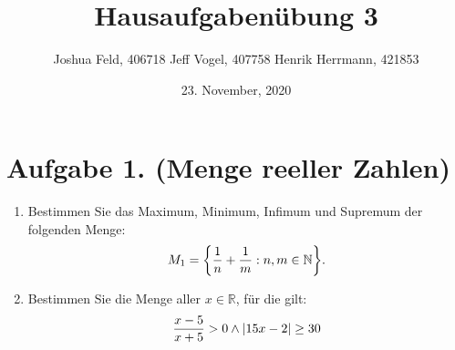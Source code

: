 \documentclass[german,12pt]{homework}
\title{Hausaufgabenübung 3}
\author{Joshua Feld, 406718 \quad Jeff Vogel, 407758 \quad Henrik Herrmann, 421853}
\date{23. November, 2020}
\institute{RWTH Aachen University\\Center for Computational Engineering Science}
\newcommand{\NN}{\mathbb{N}}
\newcommand{\RR}{\mathbb{R}}
\DeclarePairedDelimiter{\absolute}{\lvert}{\rvert}
\DeclarePairedDelimiter{\penbrace}{\{}{\}}
\begin{document}
    \maketitle

    \section*{Aufgabe 1. (Menge reeller Zahlen)}

    \begin{problem}
        \begin{enumerate}
            \item Bestimmen Sie das Maximum, Minimum, Infimum und Supremum der
            folgenden Menge:
            \[M_1 = \penbrace*{\frac{1}{n} + \frac{1}{m} : n, m \in \NN}.\]
            \item Bestimmen Sie die Menge aller \(x \in \RR\), für die gilt:
            \[\frac{x - 5}{x + 5} > 0 \land \absolute*{15x - 2} \ge 30\]
        \end{enumerate}
    \end{problem}
\end{document}
